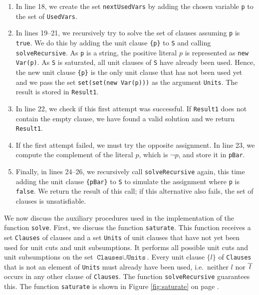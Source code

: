 \begin{enumerate}
  we select an arbitrary variable \texttt{p} from the set of \texttt{Variables} that has not yet been used
  (i.e., it is not in \texttt{UsedVars}).  Note that \texttt{p} is the name of the variable, i.e.~it is a
  string.  It is very important to use the function \texttt{arb} here, as
  \texttt{arb} picks a random element from a set.  If we instead used a function that always picks the
  first element of a given set, the performance of the implementation would degrade seriously.
\item In line 18, we create the set \texttt{nextUsedVars} by adding the chosen variable \texttt{p} to the set
  of \texttt{UsedVars}.
\item In lines 19--21, we recursively try to solve the set of clauses assuming \texttt{p} is \texttt{true}. We
  do this by adding the unit clause \texttt{\{p\}} to \texttt{S} and calling \texttt{solveRecursive}.  As
  \texttt{p} is a string, the positive literal $p$ is represented as \texttt{new Var(p)}.  As \texttt{S} is
  saturated, all unit clauses of \texttt{S} have already been used.  Hence, the new unit clause
  \texttt{\{p\}} is the only unit clause that has not been used yet and we pass the set
  \texttt{set(set(new Var(p)))} as the argument \texttt{Units}.  The result is stored in \texttt{Result1}.
\item In line 22, we check if this first attempt was successful. If \texttt{Result1} does not contain the empty
  clause, we have found a valid solution and we return \texttt{Result1}.
\item If the first attempt failed, we must try the opposite assignment. In line 23, we compute the complement
  of the literal $p$, which is $\neg p$, and store it in \texttt{pBar}.
\item Finally, in lines 24--26, we recursively call \texttt{solveRecursive} again, this time adding the unit
  clause \texttt{\{pBar\}} to \texttt{S} to simulate the assignment where \texttt{p} is \texttt{false}. We
  return the result of this call; if this alternative also fails, the set of clauses is unsatisfiable.
\end{enumerate}

We now discuss the auxiliary procedures used in the implementation of the function
\texttt{solve}.
First, we discuss the function \texttt{saturate}. This function receives a
set \texttt{Clauses} of clauses and a set \texttt{Units} of unit clauses that have not yet been used for unit
cuts and unit subsumptions.  It performs all possible unit cuts and unit subsumptions on the set
$\texttt{Clauses} \cup \texttt{Units}$.  Every unit clause $\{l\}$ of \texttt{Clauses} that is not an element of
\texttt{Units} must already have been used, i.e.~neither $l$ nor $\overline{\,l\,}$ occurs in any other clause of
\texttt{Clauses}.  The function \texttt{solveRecursive} guarantees this.
The function \texttt{saturate} is shown in Figure \ref{fig:saturate} on page \pageref{fig:saturate}.

